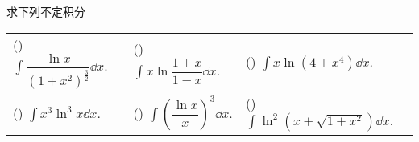 \begin{example}
    求下列不定积分
    \setcounter{magicrownumbers}{0}
    \begin{table}[H]
        \centering
        \begin{tabular}{l | l | l}
            (\rownumber{}) $\displaystyle\int\dfrac{\ln x}{\left(1+x^2\right)^{\frac{3}{2}}}\dd x.$ & (\rownumber{}) $\displaystyle\int x\ln\dfrac{1+x}{1-x}\dd x.$           & (\rownumber{}) $\displaystyle\int x\ln\left(4+x^4\right)\dd x.$          \\
            (\rownumber{}) $\displaystyle\int x^3\ln^3x\dd x.$                                      & (\rownumber{}) $\displaystyle\int\left(\dfrac{\ln x}{x}\right)^3\dd x.$ & (\rownumber{}) $\displaystyle\int\ln^2\left(x+\sqrt{1+x^2}\right)\dd x.$
        \end{tabular}
    \end{table}
\end{example}

